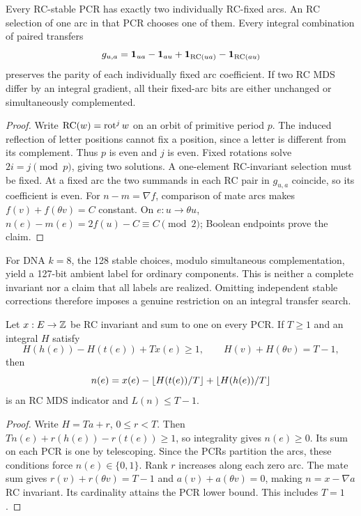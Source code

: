 \begin{lemma}
\label{lem:stable-pcr-parity}
Every RC-stable PCR has exactly two individually RC-fixed arcs.
An RC selection of one arc in that PCR chooses one of them.
Every integral combination of paired transfers
\[
 g_{u,a}=\mathbf 1_{ua}-\mathbf 1_{au}
             +\mathbf 1_{\operatorname{RC}(ua)}-\mathbf 1_{\operatorname{RC}(au)}
\]
preserves the parity of each individually fixed arc coefficient.
If two RC MDS differ by an integral gradient, all their fixed-arc
bits are either unchanged or simultaneously complemented.
\end{lemma}
\begin{proof}
Write $\operatorname{RC}(w)=\operatorname{rot}^j w$ on an orbit of primitive period $p$.
The induced reflection of letter positions cannot fix a position,
since a letter is different from its complement. Thus $p$ is even
and $j$ is even. Fixed rotations solve $2i=j\pmod p$, giving two
solutions. A one-element RC-invariant selection must be fixed.
At a fixed arc the two summands in each RC pair in $g_{u,a}$
coincide, so its coefficient is even.
For $n-m=\nabla f$, comparison of mate arcs makes
$f(v)+f(\theta v)=C$ constant. On $e:u\to\theta u$,
$n(e)-m(e)=2f(u)-C\equiv C\pmod2$; Boolean endpoints prove the claim.
\end{proof}
For DNA $k=8$, the 128 stable choices, modulo simultaneous
complementation, yield a 127-bit ambient label for ordinary
components. This is neither a complete invariant nor a claim that
all labels are realized. Omitting independent stable corrections
therefore imposes a genuine restriction on an integral transfer search.

\begin{lemma}
\label{lem:signed-reconstruction}
Let $x:E\to\mathbb Z$ be RC invariant and sum to one on every PCR.
If $T\ge1$ and an integral $H$ satisfy
\begin{equation}
 H(h(e))-H(t(e))+Tx(e)\ge1,\qquad
 H(v)+H(\theta v)=T-1,
 \label{eq:signed-clock}
\end{equation}
then
\[
 n(e)=x(e)-\left\lfloor H(t(e))/T\right\rfloor+\left\lfloor H(h(e))/T\right\rfloor
\]
is an RC MDS indicator and $L(n)\le T-1$.
\end{lemma}
\begin{proof}
Write $H=Ta+r$, $0\le r<T$. Then
$Tn(e)+r(h(e))-r(t(e))\ge1$, so integrality gives $n(e)\ge0$.
Its sum on each PCR is one by telescoping. Since the PCRs partition
the arcs, these conditions force $n(e)\in\{0,1\}$. Rank $r$
increases along each zero arc. The mate sum gives
$r(v)+r(\theta v)=T-1$ and $a(v)+a(\theta v)=0$, making
$n=x-\nabla a$ RC invariant. Its cardinality attains the PCR lower
bound. This includes $T=1$.
\end{proof}

